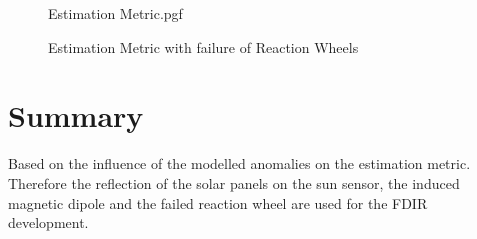 \begin{figure}[!htb]
\centering

{Estimation Metric.pgf}

\caption{Estimation Metric with failure of Reaction Wheels}
\label{fig:catastrophicReactionWheels}
\end{figure}

\section{Summary}
Based on the influence of the modelled anomalies on the estimation metric. Therefore the reflection of the solar panels on the sun sensor, the induced magnetic dipole and the failed reaction wheel are used for the FDIR development.

